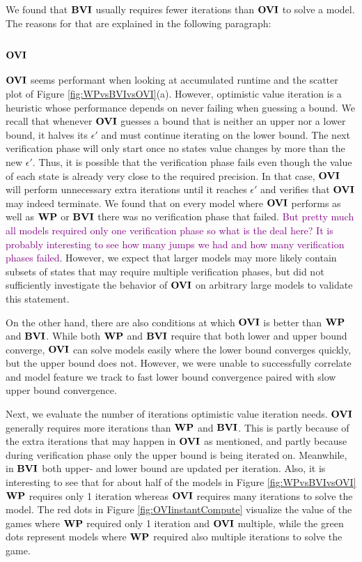 We found that $\mathbf{BVI}$ usually requires fewer iterations than $\mathbf{OVI}$ to solve a model.
The reasons for that are explained in the following paragraph:

\subsubsection*{\underline{$\mathbf{OVI}$}}
$\mathbf{OVI}$ seems performant when looking at accumulated runtime and the scatter plot of Figure \ref{fig:WPvsBVIvsOVI}(a).
However, optimistic value iteration is a heuristic whose performance depends on never failing when guessing a bound.
We recall that whenever $\mathbf{OVI}$ guesses a bound that is neither an upper nor a lower bound, it halves its $\epsilon'$ and must continue iterating on the lower bound.
The next verification phase will only start once no states value changes by more than the new $\epsilon'$.
Thus, it is possible that the verification phase fails even though the value of each state is already very close to the required precision.
In that case, $\mathbf{OVI}$ will perform unnecessary extra iterations until it reaches $\epsilon'$ and verifies that $\mathbf{OVI}$ may indeed terminate.
We found that on every model where $\mathbf{OVI}$ performs as well as $\mathbf{WP}$ or $\mathbf{BVI}$ there was no verification phase that failed.
\textcolor{purple}{But pretty much all models required only one verification phase so what is the deal here? It is probably interesting to see how many jumps 
we had and how many verification phases failed}.
However, we expect that larger models may more likely contain subsets of states that may require multiple verification phases, 
but did not sufficiently investigate the behavior of $\mathbf{OVI}$ on arbitrary large models to validate this statement.

On the other hand, there are also conditions at which $\mathbf{OVI}$ is better than $\mathbf{WP}$ and $\mathbf{BVI}$.
While both $\mathbf{WP}$ and $\mathbf{BVI}$ require that both lower and upper bound converge, 
$\mathbf{OVI}$ can solve models easily where the lower bound converges quickly, but the upper bound does not.
However, we were unable to successfully correlate and model feature we track to fast lower bound convergence paired with slow upper bound convergence. 

Next, we evaluate the number of iterations optimistic value iteration needs. $\mathbf{OVI}$ generally requires more iterations than $\mathbf{WP}$ and $\mathbf{BVI}$. This is partly because of the extra iterations that may happen in $\mathbf{OVI}$ as mentioned, 
and partly because during verification phase only the upper bound is being iterated on. Meanwhile, in $\mathbf{BVI}$ both upper- and lower bound are updated per iteration.
Also, it is interesting to see that for about half of the models in Figure \ref{fig:WPvsBVIvsOVI} $\mathbf{WP}$ requires only 1 iteration whereas $\mathbf{OVI}$ requires many iterations to solve the model.
The red dots in Figure \ref{fig:OVIinstantCompute} visualize the value of the games where $\mathbf{WP}$ required only 1 iteration and $\mathbf{OVI}$ multiple,
while the green dots represent models where $\mathbf{WP}$ required also multiple iterations to solve the game.

